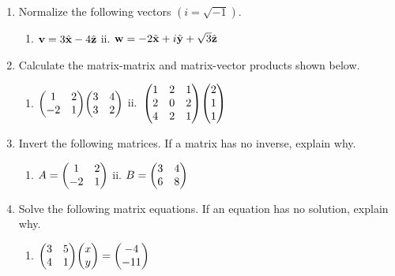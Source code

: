 \documentclass{article}
\begin{document}
\pagestyle{fancy}
\fancyhf{}
\rfoot{\thepage}
\renewcommand{\headrulewidth}{0pt}
\begin{enumerate}
  \item Normalize the following vectors
   $(i=\sqrt{-1})$.
    \begin{enumerate}[label=i.]
      \item $\vb{v}=3\hat{\vb{x}}-4\hat{\vb{z}}$\hspace{5cm}
      ii. $\vb{w}=-2\hat{\vb{x}}+i\hat{\vb{y}}+\sqrt{3}\hat{\vb{z}}$
    \end{enumerate}
  \vspace{3.5cm}
  \item Calculate the matrix-matrix and matrix-vector products shown below.
    \begin{enumerate}[label=i.]
      \item \( \displaystyle \mqty(1 & 2 \\ -2 & 1)\mqty(3 & 4\\3 & 2) \)\hspace{3cm} ii.\ \( \displaystyle \mqty(1 & 2 & 1\\2 & 0 & 2\\4 & 2 & 1)\mqty(2 \\ 1 \\ 1) \)
    \end{enumerate}
  \vspace{3.5cm}
  \item Invert the following matrices.  If a matrix has no inverse, explain why.
    \begin{enumerate}[label=i.]
      \item $A = \mqty(1 & 2 \\ -2 & 1)$
      \hspace{4cm}
      ii. $B = \mqty(3 & 4\\6 & 8)$
    \end{enumerate}
  \vspace{3.5cm}
  \item Solve the following matrix equations.  If an equation has no solution, explain why.
      \begin{enumerate}[label=i.]
          \item
          \( \displaystyle \mqty(3&5\\4&1)\mqty(x\\y)=\mqty(-4\\-11) \)
          \hspace{3cm}

\end{enumerate}
\end{enumerate}
\end{document}
